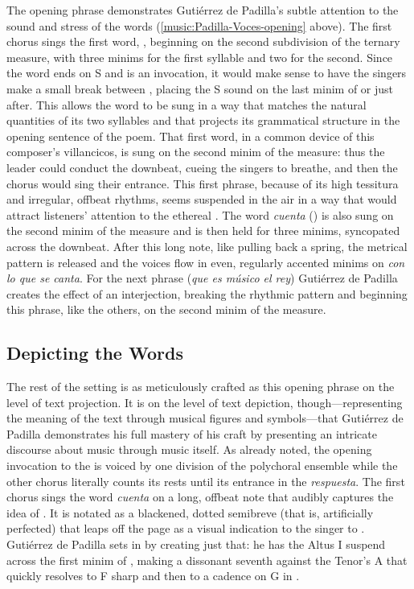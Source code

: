 The opening phrase demonstrates Gutiérrez de Padilla's subtle attention to the
sound and stress of the words (\cref{music:Padilla-Voces-opening} above).
The first chorus sings the first word, , beginning on the second
subdivision of the ternary measure, with three minims for the first syllable and
two for the second.
Since the word ends on S and is an invocation, it would make sense to have the
singers make a small break between , placing the S sound on the
last minim of  or just after.
This allows the word to be sung in a way that matches the natural quantities of
its two syllables and that projects its grammatical structure in the opening
sentence of the poem.
That first word, in a common device of this composer's villancicos, is sung on
the second minim of the measure: thus the leader could conduct the downbeat,
cueing the singers to breathe, and then the chorus would sing their entrance. 
This first phrase, because of its high tessitura and irregular, offbeat rhythms,
seems suspended in the air in a way that would attract listeners' attention to
the ethereal . 
The word \emph{cuenta} () is also sung on the second minim of the
measure and is then held for three minims, syncopated across the downbeat.
After this long note, like pulling back a spring, the metrical pattern is
released and the voices flow in even, regularly accented minims on \emph{con lo
que se canta}.
For the next phrase (\emph{que es músico el rey}) Gutiérrez de Padilla creates
the effect of an interjection, breaking the rhythmic pattern and beginning this
phrase, like the others, on the second minim of the measure.


\subsection{Depicting the Words}

The rest of the setting is as meticulously crafted as this opening phrase on the
level of text projection.
It is on the level of text depiction, though---representing the meaning of the text
through musical figures and symbols---that Gutiérrez de Padilla demonstrates his
full mastery of his craft by presenting an intricate discourse about music
through music itself.
As already noted, the opening invocation to the  is voiced by one division of the polychoral
ensemble while the other chorus literally counts its rests until its entrance in
the \emph{respuesta}.
The first chorus sings the word \emph{cuenta} on a long, offbeat note that
audibly captures the idea of .
It is notated as a blackened, dotted semibreve (that is, artificially perfected)
that leaps off the page as a visual indication to the singer to .
Gutiérrez de Padilla sets  in 
by creating just that: he has the Altus I suspend across the first minim of
, making a dissonant seventh against the Tenor's A that quickly
resolves to F sharp and then to a cadence on G in .

